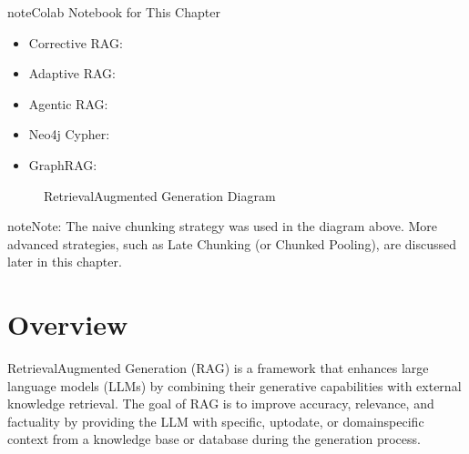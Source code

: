 \documentclass[letterpaper,11pt,english]{sphinxmanual}
\begin{document}
\begin{sphinxadmonition}{note}{Colab Notebook for This Chapter}
\begin{itemize}
\item {} 
\sphinxAtStartPar
Corrective RAG: 

\item {} 
\sphinxAtStartPar
Adaptive RAG: 

\item {} 
\sphinxAtStartPar
Agentic RAG: 

\end{itemize}

\sphinxAtStartPar
\textendash{}
\begin{itemize}
\item {} 
\sphinxAtStartPar
Neo4j Cypher: 

\item {} 
\sphinxAtStartPar
Graph\sphinxhyphen{}RAG: 

\end{itemize}
\end{sphinxadmonition}

\begin{figure}[htbp]
\centering
\capstart

\noindent{}
\caption{Retrieval\sphinxhyphen{}Augmented Generation Diagram}\label{\detokenize{rag:id54}}\label{\detokenize{rag:fig-rag}}\end{figure}

\begin{sphinxadmonition}{note}{Note:}
\sphinxAtStartPar
The naive chunking strategy was used in the diagram above. More advanced strategies,
such as Late Chunking  (or Chunked Pooling), are discussed later in this chapter.
\end{sphinxadmonition}


\section{Overview}
\label{\detokenize{rag:overview}}
\sphinxAtStartPar
Retrieval\sphinxhyphen{}Augmented Generation (RAG) is a framework that enhances large language models (LLMs)
by combining their generative capabilities with external knowledge retrieval. The goal of RAG
is to improve accuracy, relevance, and factuality by providing the LLM with specific, up\sphinxhyphen{}to\sphinxhyphen{}date,
or domain\sphinxhyphen{}specific context from a knowledge base or database during the generation process.
\end{document}
